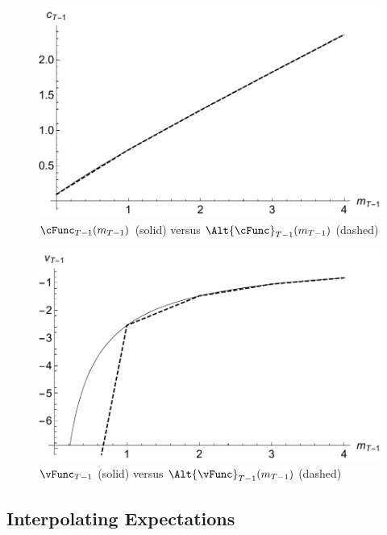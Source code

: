 \documentclass[titlepage]{\econtex}
\begin{document}
\hypertarget{PlotcTm1Simple}{}
\begin{figure}
        \includegraphics{./Figures/PlotcTm1Simple}
         \caption{$\cFunc_{T-1}({m}_{T-1})$ (solid) versus $\Alt{\cFunc}_{T-1}({m}_{T-1})$ (dashed)}
        \label{fig:PlotcTm1Simple}
\end{figure}

\hypertarget{PlotvTm1Simple}{}
\begin{figure}
        \includegraphics{./Figures/PlotVTm1Simple}
        \caption{$\vFunc_{T-1}$ (solid) versus $\Alt{\vFunc}_{T-1}({m}_{T-1})$ (dashed)}
        \label{fig:PlotVTm1Simple}
\end{figure}

\hypertarget{Interpolating-Expectations}{}
\subsection{Interpolating Expectations}

\end{document}
